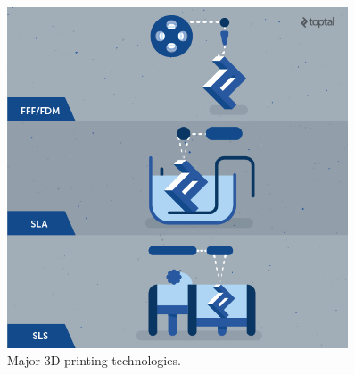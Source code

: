 	\begin{figure}[H]
		\includegraphics[width=0.9\textwidth]{imgs/3dp_fdm_sla_sls.jpeg}
		\caption{Major 3D printing technologies.}
	\end{figure}
 	
